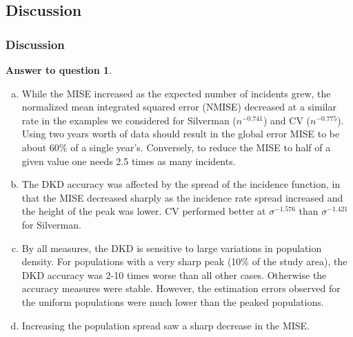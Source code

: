 \documentclass[notheorems]{beamer}
\theoremstyle{definition}
\newtheorem{answer}{Answer to question}
\theoremstyle{example}
\begin{document}
\subsection{Discussion}
\begin{frame}\frametitle{Discussion}
    \footnotesize
    \begin{answer}
        \begin{enumerate}[a)]
            \item
                While the MISE increased as the expected number of incidents grew,
                the normalized mean integrated squared error (NMISE) decreased at a similar rate in the examples we considered
                for Silverman ($n^{-0.741}$) and CV ($n^{-0.775}$).
                Using two years worth of data should result in the global error MISE to be about 60\% of a single year's.
                Conversely, to reduce the MISE to half of a given value one needs 2.5 times as many incidents.
            \item
                The DKD accuracy was affected by the spread of the incidence function,
                in that the MISE decreased sharply as the incidence rate spread increased and the height of the peak was lower.
                CV performed better at $\sigma^{-1.576}$ than $\sigma^{-1.421}$ for Silverman.
            \item
                By all measures, the DKD is sensitive to large variations in population density.
                For populations with a very sharp peak (10\% of the study area),
                the DKD accuracy was 2-10 times worse than all other cases.
                Otherwise the accuracy measures were stable.
                However, the estimation errors observed for the uniform populations were much lower than the peaked populations.
            \item
                Increasing the population spread saw a sharp decrease in the MISE.
        \end{enumerate}
    \end{answer}
\end{frame}

\end{document}
